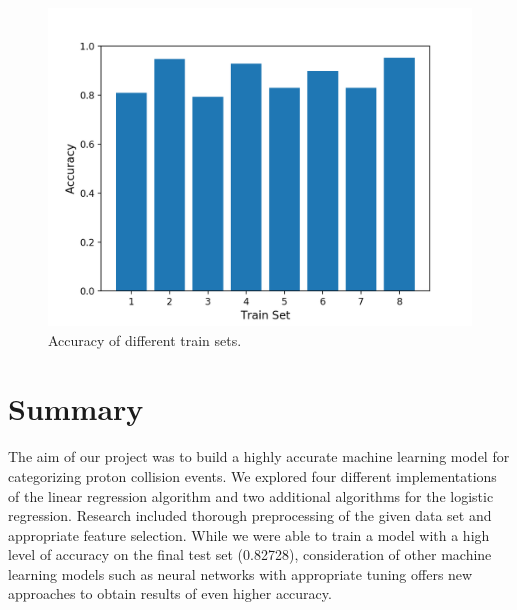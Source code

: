 \documentclass[10pt,conference,compsocconf]{IEEEtran}
\begin{document}
\begin{figure}[h]
  \centering
  \includegraphics[width=0.9\columnwidth]{train_set_accuracies}
  \caption{Accuracy of different train sets.}
  \vspace{-3mm}
\end{figure}

\section{Summary}

The aim of our project was to build a highly accurate machine learning model for categorizing proton collision events. We explored four different implementations of the linear regression algorithm and two additional algorithms for the logistic regression. Research included thorough preprocessing of the given data set and appropriate feature selection. While we were able to train a model with a high level of accuracy on the final test set (0.82728), consideration of other machine learning models such as neural networks with appropriate tuning offers new approaches to obtain results of even higher accuracy.
\end{document}
